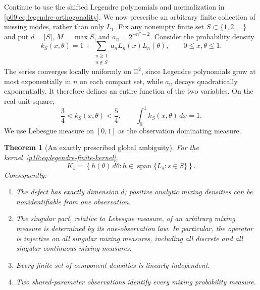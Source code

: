\documentclass[11pt,letterpaper]{article}
\newtheorem{theorem}{Theorem}[section]
\theoremstyle{definition}
\theoremstyle{remark}
\newcommand{\1}{\mathbf 1}
\begin{document}
Continue to use the shifted Legendre polynomials and normalization
in \eqref{p09:eq:legendre-orthogonality}. We now prescribe an arbitrary
finite collection of missing modes, rather than only $L_1$.
Fix any nonempty finite set $S\subset\{1,2,\ldots\}$ and put
$d=|S|$, $M=\max S$, and $a_n=2^{-n^2-2}$.  Consider the probability density
\begin{equation}\label{p10:eq:legendre-finite-kernel}
 k_S(x,\theta)=1+\sum_{\substack{n\geq1\\n\notin S}}
                   a_nL_n(x)L_n(\theta),
 \qquad 0\leq x,\theta\leq1.
\end{equation}
The series converges locally uniformly on $\mathbb C^2$, since Legendre
polynomials grow at most exponentially in $n$ on each compact set, while
$a_n$ decays quadratically exponentially.  It therefore defines an entire
function of the two variables.  On the real unit square,
\[
 \frac34<k_S(x,\theta)<\frac54,
 \qquad\int_0^1 k_S(x,\theta)\,dx=1.
\]
We use Lebesgue measure on $[0,1]$ as the observation dominating measure.

\begin{theorem}[An exactly prescribed global ambiguity]
\label{p10:thm:legendre-exact-defect}
For the kernel~\eqref{p10:eq:legendre-finite-kernel},
\begin{equation}\label{p10:eq:legendre-nullspace}
 K_1=\left\{h(\theta)\,d\theta:
                   h\in\operatorname{span}\{L_s:s\in S\}\right\}.
\end{equation}
Consequently:
\begin{enumerate}
\item The defect has exactly dimension $d$; positive analytic mixing
densities can be nonidentifiable from one observation.
\item The singular part, relative to Lebesgue measure, of an arbitrary
mixing measure is determined by its one-observation law.  In particular,
the operator is injective on all singular mixing measures, including all
discrete and all singular continuous mixing measures.
\item Every finite set of component densities is linearly independent.
\item Two shared-parameter observations identify every mixing probability
measure.
\end{enumerate}
\end{theorem}
\end{document}
